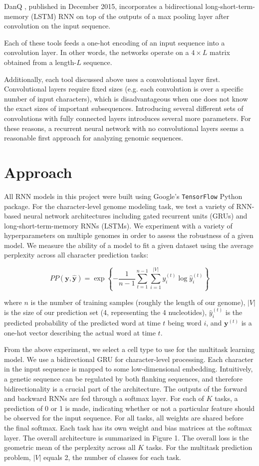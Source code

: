 \documentclass{article} %
\begin{document}
DanQ \cite{quang2015danq}, published in December 2015, incorporates a bidirectional long-short-term-memory (LSTM) RNN on top of the outputs of a max pooling layer after convolution on the input sequence.

Each of these tools feeds a one-hot encoding of an input sequence into a convolution layer. In other words, the networks operate on a $4\times L$ matrix obtained from a length-$L$ sequence. 

Additionally, each tool discussed above uses a convolutional layer first. Convolutional layers require fixed sizes (e.g. each convolution is over a specific number of input characters), which is disadvantageous when one does not know the exact sizes of important subsequences. Introducing several different sets of convolutions with fully connected layers introduces several more parameters. For these reasons, a recurrent neural network with no convolutional layers seems a reasonable first approach for analyzing genomic sequences.

\section{Approach}

All RNN models in this project were built using Google's \texttt{TensorFlow} Python package. For the character-level genome modeling task, we test a variety of RNN-based neural network architectures including gated recurrent units (GRUs) and long-short-term-memory RNNs (LSTMs). We experiment with a variety of hyperparameters on multiple genomes in order to assess the robustness of a given model. We measure the ability of a model to fit a given dataset using the average perplexity across all character prediction tasks:

$$
	PP(\mathbf{y},\mathbf{\hat{y}}) = \exp \left\{-\frac{1}{n-1} \sum_{t=1}^{n-1} \sum_{i=1}^{|V|} y_i^{(t)} \log \hat{y}_i^{(t)}\right\}
$$

where $n$ is the number of training samples (roughly the length of our genome), $|V|$ is the size of our prediction set (4, representing the 4 nucleotides), $\hat{y}^{(t)}_i$ is the predicted probability of the predicted word at time $t$ being word $i$, and $\mathbf{y}^{(t)}$ is a one-hot vector describing the actual word at time $t$.

From the above experiment, we select a cell type to use for the multitask learning model. We use a bidirectional GRU for character-level processing. Each character in the input sequence is mapped to some low-dimensional embedding. Intuitively, a genetic sequence can be regulated by both flanking sequences, and therefore bidirectionality is a crucial part of the architecture. The outputs of the forward and backward RNNs are fed through a softmax layer. For each of $K$ tasks, a prediction of 0 or 1 is made, indicating whether or not a particular feature should be observed for the input sequence. For all tasks, all weights are shared before the final softmax. Each task has its own weight and bias matrices at the softmax layer. The overall architecture is summarized in Figure 1. The overall loss is the geometric mean of the perplexity across all $K$ tasks. For the multitask prediction problem, $|V|$ equals 2, the number of classes for each task. 
\end{document}
